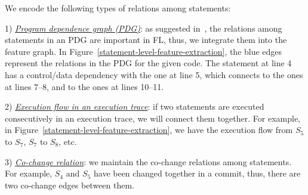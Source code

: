 We encode the following types of relations among statements:

1) {\em \underline{Program dependence graph (PDG)}}: as suggested
in~\cite{icse21-fl}, the relations among statements in an PDG are
important in FL, thus, we integrate them into the feature graph. In
Figure~\ref{statement-level-feature-extraction}, the blue edges
represent the relations in the PDG for the given code.  The statement
at line 4 has a control/data dependency with the one at line 5, which
connects to the ones at lines 7--8, and to the ones at lines 10--11.

2) {\em \underline{Execution flow in an execution trace}}: if two
statements are executed consecutively in an execution trace, we will
connect them together. For example, in
Figure~\ref{statement-level-feature-extraction}, we have the execution
flow from $S_5$ to $S_7$, $S_7$ to $S_8$, etc.



3) {\em \underline{Co-change relation}}: we maintain the co-change
relations among statements. For example, $S_4$ and $S_5$ have been
changed together in a commit, thus, there are two co-change edges
between them.



